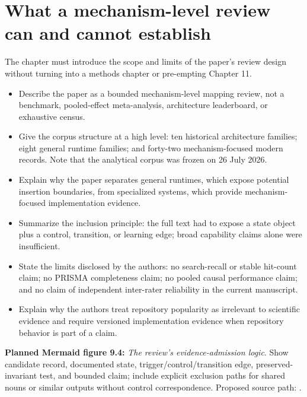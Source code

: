 \section{What a mechanism-level review can and cannot establish}
The chapter must introduce the scope and limits of the paper's review design without turning into a methods chapter or pre-empting Chapter 11.
\begin{itemize}
  \item Describe the paper as a bounded mechanism-level mapping review, not a benchmark, pooled-effect meta-analysis, architecture leaderboard, or exhaustive census.
  \item Give the corpus structure at a high level: ten historical architecture families; eight general runtime families; and forty-two mechanism-focused modern records. Note that the analytical corpus was frozen on 26 July 2026.
  \item Explain why the paper separates general runtimes, which expose potential insertion boundaries, from specialized systems, which provide mechanism-focused implementation evidence.
  \item Summarize the inclusion principle: the full text had to expose a state object plus a control, transition, or learning edge; broad capability claims alone were insufficient.
  \item State the limits disclosed by the authors: no search-recall or stable hit-count claim; no PRISMA completeness claim; no pooled causal performance claim; and no claim of independent inter-rater reliability in the current manuscript.
  \item Explain why the authors treat repository popularity as irrelevant to scientific evidence and require versioned implementation evidence when repository behavior is part of a claim.
\end{itemize}
\textbf{Planned Mermaid figure 9.4:} \emph{The review's evidence-admission logic}. Show candidate record, documented state, trigger/control/transition edge, preserved-invariant test, and bounded claim; include explicit exclusion paths for shared nouns or similar outputs without control correspondence. Proposed source path: .

